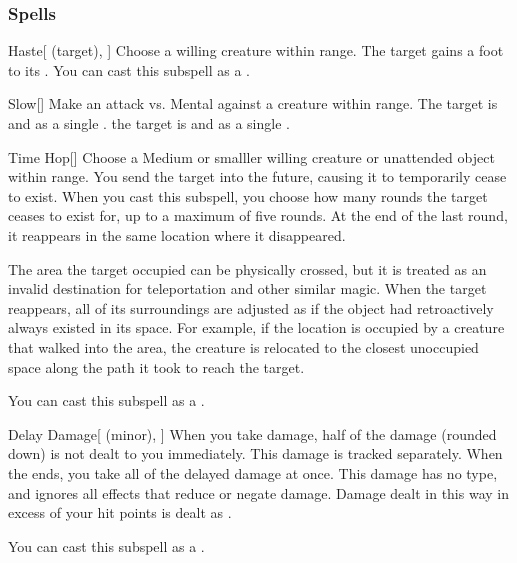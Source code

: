 \subsubsection{Spells}


\begin{ability}[\nth{1}]{Haste}[ (target), ]
Choose a willing creature within \rngmed range.
The target gains a  foot  to its .
You can cast this subspell as a .
\end{ability}
\vspace{0.25em}



\begin{ability}[\nth{1}]{Slow}[]
Make an attack vs. Mental against a creature within \rngmed range.
\hit The target is  and  as a single .
\crit the target is  and  as a single .
\end{ability}
\vspace{0.25em}



\begin{ability}[\nth{2}]{Time Hop}[]
Choose a Medium or smalller willing creature or unattended object within \rngmed range.
You send the target into the future, causing it to temporarily cease to exist.
When you cast this subspell, you choose how many rounds the target ceases to exist for, up to a maximum of five rounds.
At the end of the last round, it reappears in the same location where it disappeared.

The area the target occupied can be physically crossed, but it is treated as an invalid destination for teleportation and other similar magic.
When the target reappears, all of its surroundings are adjusted as if the object had retroactively always existed in its space.
For example, if the location is occupied by a creature that walked into the area, the creature is relocated to the closest unoccupied space along the path it took to reach the target.

You can cast this subspell as a .
\end{ability}
\vspace{0.25em}



\begin{ability}[\nth{3}]{Delay Damage}[ (minor), ]
When you take damage, half of the damage (rounded down) is not dealt to you immediately.
This damage is tracked separately.
When the ends, you take all of the delayed damage at once.
This damage has no type, and ignores all effects that reduce or negate damage.
Damage dealt in this way in excess of your hit points is dealt as .

You can cast this subspell as a .
\end{ability}
\vspace{0.25em}



